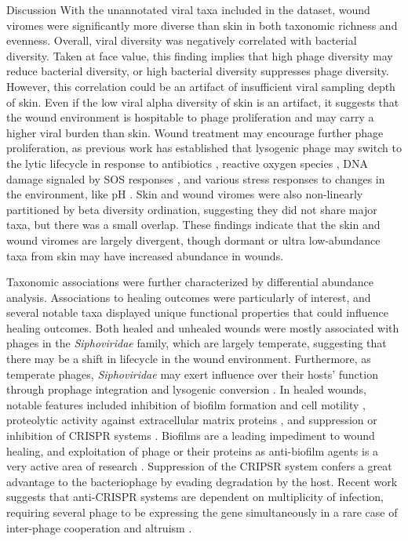 \documentclass[oneside,12pt,final]{sty/ucthesis-CA2012}
\begin{document}
\begin{mainmatter}
\begin{section}{Discussion}
With the unannotated viral taxa included in the dataset, wound viromes were significantly more diverse than skin in both taxonomic richness and evenness. Overall, viral diversity was negatively correlated with bacterial diversity. Taken at face value, this finding implies that high phage diversity may reduce bacterial diversity, or high bacterial diversity suppresses phage diversity. However, this correlation could be an artifact of insufficient viral sampling depth of skin. Even if the low viral alpha diversity of skin is an artifact, it suggests that the wound environment is hospitable to phage proliferation and may carry a higher viral burden than skin. Wound treatment may encourage further phage proliferation, as previous work has established that lysogenic phage may switch to the lytic lifecycle in response to antibiotics \cite{RN159}, reactive oxygen species \cite{RN158}, DNA damage signaled by SOS responses \cite{RN157}, and various stress responses to changes in the environment, like pH \cite{RN160, RN161}. Skin and wound viromes were also non-linearly partitioned by beta diversity ordination, suggesting they did not share major taxa, but there was a small overlap. These findings indicate that the skin and wound viromes are largely divergent, though dormant or ultra low-abundance taxa from skin may have increased abundance in wounds. 

Taxonomic associations were further characterized by differential abundance analysis. Associations to healing outcomes were particularly of interest, and several notable taxa displayed unique functional properties that could influence healing outcomes. Both healed and unhealed wounds were mostly associated with phages in the \textit{Siphoviridae} family, which are largely temperate, suggesting that there may be a shift in lifecycle in the wound environment. Furthermore, as temperate phages, \textit{Siphoviridae} may exert influence over their hosts' function through prophage integration and lysogenic conversion \cite{RN151, RN156}. In healed wounds, notable features included inhibition of biofilm formation and cell motility \cite{RN178, RN180}, proteolytic activity against extracellular matrix proteins \cite{RN186}, and suppression or inhibition of CRISPR systems \cite{RN179, RN180}. Biofilms are a leading impediment to wound healing, and exploitation of phage or their proteins as anti-biofilm agents is a very active area of research \cite{RN146, RN147, RN148, RN149}. Suppression of the CRIPSR system confers a great advantage to the bacteriophage by evading degradation by the host. Recent work suggests that anti-CRISPR systems are dependent on multiplicity of infection, requiring several phage to be expressing the gene simultaneously in a rare case of inter-phage cooperation and altruism \cite{RN150}. 


\end{section}
\end{mainmatter}
\end{document}

